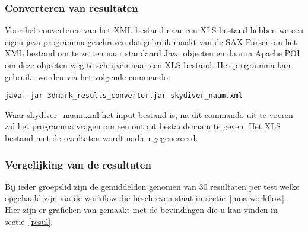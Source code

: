 \subsubsection{Converteren van resultaten}
Voor het converteren van het XML bestand naar een XLS bestand hebben we een eigen java programma geschreven dat gebruik maakt van de SAX Parser om het XML bestand om te zetten naar standaard Java objecten en daarna Apache POI om deze objecten weg te schrijven naar een XLS bestand. Het programma kan gebruikt worden via het volgende commando:
\begin{lstlisting}
java -jar 3dmark_results_converter.jar skydiver_naam.xml
\end{lstlisting}
Waar skydiver\_naam.xml het input bestand is, na dit commando uit te voeren zal het programma vragen om een output bestandsnaam te geven. Het XLS bestand met de resultaten wordt nadien gegenereerd.

\subsubsection{Vergelijking van de resultaten}
Bij ieder groepslid zijn de gemiddelden genomen van 30 resultaten per test welke opgehaald zijn via de workflow die beschreven staat in sectie~\ref{moa-workflow}. Hier zijn er grafieken van gemaakt met de bevindingen die u kan vinden in sectie~\ref{resul}.